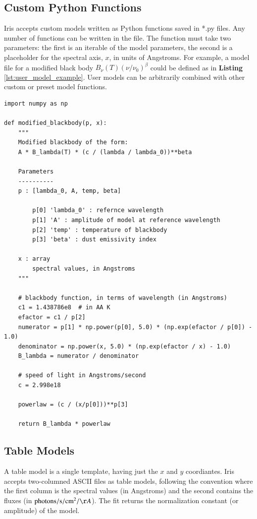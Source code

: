 \documentclass[5p]{elsarticle}
\begin{document}

\subsection{Custom Python Functions}
Iris accepts custom models written as Python functions saved in *.py files. Any number of functions can be written in the file. The function must take two parameters: the first is an iterable of the model parameters, the second is a placeholder for the spectral axis, $x$, in units of Angstroms. For example, a model file for a modified black body
\(B_{\nu}(T) \left(\nu/\nu_{0}\right)^{\beta}\)
could be defined as in \textbf{Listing} \ref{lst:user_model_example}. User models can be arbitrarily combined with other custom or preset model functions.


\begin{lstlisting}[style=python, caption=My Caption, label=lst:user_model_example]
import numpy as np

def modified_blackbody(p, x):
    """
    Modified blackbody of the form:
    A * B_lambda(T) * (c / (lambda / lambda_0))**beta

    Parameters
    ----------
    p : [lambda_0, A, temp, beta]

        p[0] 'lambda_0' : refernce wavelength
        p[1] 'A' : amplitude of model at reference wavelength
        p[2] 'temp' : temperature of blackbody
        p[3] 'beta' : dust emissivity index

    x : array
        spectral values, in Angstroms
    """
    
    # blackbody function, in terms of wavelength (in Angstroms)
    c1 = 1.438786e8  # in AA K
    efactor = c1 / p[2]
    numerator = p[1] * np.power(p[0], 5.0) * (np.exp(efactor / p[0]) - 1.0)
    denominator = np.power(x, 5.0) * (np.exp(efactor / x) - 1.0)
    B_lambda = numerator / denominator

    # speed of light in Angstroms/second
    c = 2.998e18

    powerlaw = (c / (x/p[0]))**p[3]

    return B_lambda * powerlaw
\end{lstlisting}


\subsection{Table Models}
A table model is a single template, having just the $x$ and $y$ coordiantes. Iris accepts two-columned ASCII files as table models, following the convention where the first column is the spectral values (in Angstroms) and the second contains the fluxes (in $\mathrm{photons}/\mathrm{s}/\mathrm{cm}^{2}/{\AA}$). The fit returns the normalization constant (or amplitude) of the model.
\end{document}
